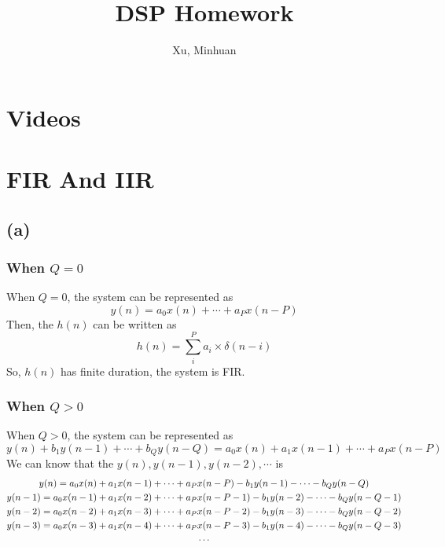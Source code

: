 \documentclass{article}
\begin{document}
\title{DSP Homework}
\author{Xu, Minhuan}
\maketitle
\tableofcontents
\begin{abstract}

\end{abstract}

\section{Videos}

\section{FIR And IIR}
\subsection{(a)}
\subsubsection{When $Q = 0$}
When $Q = 0$, the system can be represented as 
$$
y(n) = a_0x(n) + \cdots + a_Px(n - P)
$$
Then, the $h(n)$ can be written as
$$
h(n) =  \sum_i^P a_i \times \delta(n - i)
$$
So, $h(n)$ has finite duration, the system is FIR.
\subsubsection{When $Q > 0$}
When $Q > 0$, the system can be represented as 
\begin{equation}
y(n) + b_1 y(n - 1) + \cdots + b_Q y(n - Q) = a_0 x(n) + a_1 x(n - 1) + \cdots + a_P x(n - P)
\label{eq:iir}
\end{equation}
We can know that the $y(n), y(n - 1), y(n - 2), \cdots $ is 
\begin{gather}
y(n) = a_0 x(n) + a_1 x(n - 1) + \cdots + a_P x(n - P) - b_1 y(n - 1) - \cdots - b_Q y(n - Q) \label{eq:yn} \\ 
y(n - 1) = a_0 x(n - 1) + a_1 x(n - 2) + \cdots + a_P x(n - P - 1) - b_1 y(n - 2) - \cdots - b_Q y(n - Q - 1) \label{eq:yn-1} \\ 
y(n - 2) = a_0 x(n - 2) + a_1 x(n - 3) + \cdots + a_P x(n - P - 2) - b_1 y(n - 3) - \cdots - b_Q y(n - Q - 2) \label{eq:yn-2} \\ 
y(n - 3) = a_0 x(n - 3) + a_1 x(n - 4) + \cdots + a_P x(n - P - 3) - b_1 y(n - 4) - \cdots - b_Q y(n - Q - 3) \notag \\ 
\cdots \notag
\end{gather}
\end{document}
